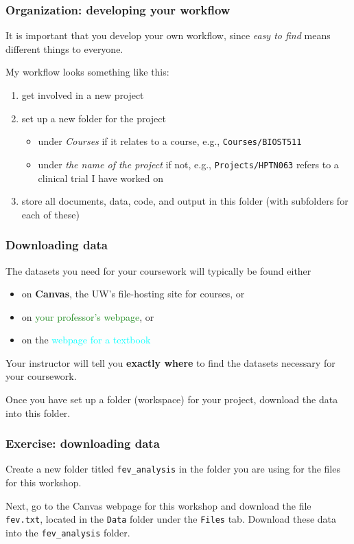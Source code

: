 \documentclass[11pt,dvipsnames]{beamer}
\begin{document}
\begin{frame}
\frametitle{Organization: developing your workflow}
It is important that you develop your own workflow, since \textit{easy to find} means different things to everyone.

My workflow looks something like this: \vspace{-0.3cm} \pause
\begin{enumerate}
\item get involved in a new project \pause
\item set up a new folder for the project 
\begin{itemize}
\item under \textit{Courses} if it relates to a course, e.g., \texttt{Courses/BIOST511}
\item under \textit{the name of the project} if not, e.g., \texttt{Projects/HPTN063} refers to a clinical trial I have worked on
\end{itemize} \pause
\item store all documents, data, code, and output in this folder (with subfolders for each of these)
\end{enumerate}
\end{frame}

\begin{frame}
\frametitle{Downloading data}
The datasets you need for your coursework will typically be found either \vspace{-0.3cm}
\begin{itemize}
\item on \textbf{Canvas}, the UW's file-hosting site for courses, or
\item on \textcolor{ForestGreen}{your professor's webpage}, or
\item on the \textcolor{cyan}{webpage for a textbook}
\end{itemize}

Your instructor will tell you \textbf{exactly where} to find the datasets necessary for your coursework.

Once you have set up a folder (workspace) for your project, download the data into this folder.
\end{frame}

\begin{frame}
\frametitle{Exercise: downloading data}
Create a new folder titled \texttt{fev\_analysis} in the folder you are using for the files for this workshop.

Next, go to the Canvas webpage for this workshop and download the file \texttt{fev.txt}, located in the \texttt{Data} folder under the \texttt{Files} tab. Download these data into the \texttt{fev\_analysis} folder.
\end{frame}
\end{document}

